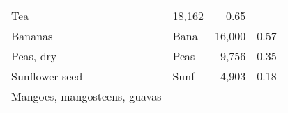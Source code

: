 \documentclass[]{article}
\begin{document}
\begin{longtable}[]{@{}llrr@{}}
\begin{minipage}[t]{0.16\columnwidth}
Tea\strut
\end{minipage} & \begin{minipage}[t]{0.12\columnwidth}\raggedleft\strut
18,162\strut
\end{minipage} & \begin{minipage}[t]{0.09\columnwidth}\raggedleft\strut
0.65\strut
\end{minipage}\tabularnewline
\begin{minipage}[t]{0.36\columnwidth}\raggedright\strut
Bananas\strut
\end{minipage} & \begin{minipage}[t]{0.16\columnwidth}\raggedright\strut
Bana\strut
\end{minipage} & \begin{minipage}[t]{0.12\columnwidth}\raggedleft\strut
16,000\strut
\end{minipage} & \begin{minipage}[t]{0.09\columnwidth}\raggedleft\strut
0.57\strut
\end{minipage}\tabularnewline
\begin{minipage}[t]{0.36\columnwidth}\raggedright\strut
Peas, dry\strut
\end{minipage} & \begin{minipage}[t]{0.16\columnwidth}\raggedright\strut
Peas\strut
\end{minipage} & \begin{minipage}[t]{0.12\columnwidth}\raggedleft\strut
9,756\strut
\end{minipage} & \begin{minipage}[t]{0.09\columnwidth}\raggedleft\strut
0.35\strut
\end{minipage}\tabularnewline
\begin{minipage}[t]{0.36\columnwidth}\raggedright\strut
Sunflower seed\strut
\end{minipage} & \begin{minipage}[t]{0.16\columnwidth}\raggedright\strut
Sunf\strut
\end{minipage} & \begin{minipage}[t]{0.12\columnwidth}\raggedleft\strut
4,903\strut
\end{minipage} & \begin{minipage}[t]{0.09\columnwidth}\raggedleft\strut
0.18\strut
\end{minipage}\tabularnewline
\begin{minipage}[t]{0.36\columnwidth}\raggedright\strut
Mangoes, mangosteens, guavas\strut
\end{minipage} & \begin{minipage}[t]{0.16\columnwidth}\raggedright\strut

\end{minipage}
\end{longtable}
\end{document}
